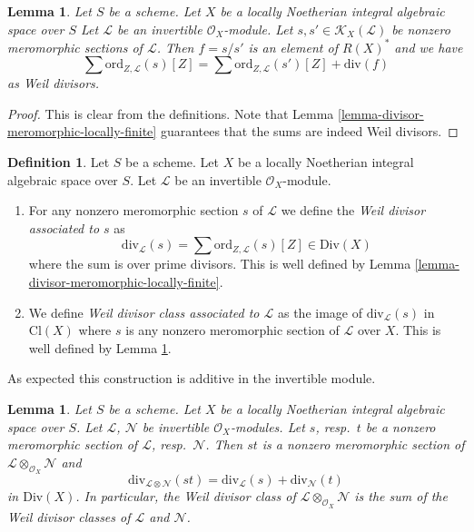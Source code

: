 \documentclass{stacks-project}
\theoremstyle{plain}
\newtheorem{lemma}[subsection]{Lemma}
\theoremstyle{definition}
\newtheorem{definition}[subsection]{Definition}
\theoremstyle{remark}
\numberwithin{equation}{subsection}
\begin{document}
\begin{lemma}
\label{lemma-divisor-meromorphic-well-defined}
Let $S$ be a scheme. Let $X$ be a locally Noetherian integral algebraic space
over $S$ Let $\mathcal{L}$ be an invertible $\mathcal{O}_X$-module.
Let $s, s' \in \mathcal{K}_X(\mathcal{L})$ be nonzero
meromorphic sections of $\mathcal{L}$. Then $f = s/s'$
is an element of $R(X)^*$ and we have
$$
\sum \text{ord}_{Z, \mathcal{L}}(s)[Z]
=
\sum \text{ord}_{Z, \mathcal{L}}(s')[Z]
+
\text{div}(f)
$$
as Weil divisors.
\end{lemma}

\begin{proof}
This is clear from the definitions.
Note that Lemma \ref{lemma-divisor-meromorphic-locally-finite}
guarantees that the sums are indeed Weil divisors.
\end{proof}

\begin{definition}
\label{definition-divisor-invertible-sheaf}
Let $S$ be a scheme. Let $X$ be a locally Noetherian integral algebraic space
over $S$. Let $\mathcal{L}$ be an invertible $\mathcal{O}_X$-module.
\begin{enumerate}
\item For any nonzero meromorphic section $s$ of $\mathcal{L}$
we define the {\it Weil divisor associated to $s$} as
$$
\text{div}_\mathcal{L}(s) =
\sum \text{ord}_{Z, \mathcal{L}}(s) [Z] \in \text{Div}(X)
$$
where the sum is over prime divisors. This is well defined by
Lemma \ref{lemma-divisor-meromorphic-locally-finite}.
\item We define {\it Weil divisor class associated to $\mathcal{L}$}
as the image of $\text{div}_\mathcal{L}(s)$ in $\text{Cl}(X)$
where $s$ is any nonzero meromorphic section of $\mathcal{L}$ over $X$.
This is well defined by
Lemma \ref{lemma-divisor-meromorphic-well-defined}.
\end{enumerate}
\end{definition}

\noindent
As expected this construction is additive in the invertible module.

\begin{lemma}
\label{lemma-c1-additive}
Let $S$ be a scheme. Let $X$ be a locally Noetherian integral algebraic space
over $S$. Let $\mathcal{L}$, $\mathcal{N}$ be invertible
$\mathcal{O}_X$-modules. Let $s$, resp.\ $t$ be a nonzero meromorphic section
of $\mathcal{L}$, resp.\ $\mathcal{N}$. Then $st$ is a nonzero
meromorphic section of $\mathcal{L} \otimes_{\mathcal{O}_X} \mathcal{N}$ and
$$
\text{div}_{\mathcal{L} \otimes \mathcal{N}}(st)
=
\text{div}_\mathcal{L}(s) + \text{div}_\mathcal{N}(t)
$$
in $\text{Div}(X)$. In particular, the Weil divisor class of
$\mathcal{L} \otimes_{\mathcal{O}_X} \mathcal{N}$ is the sum
of the Weil divisor classes of $\mathcal{L}$ and $\mathcal{N}$.
\end{lemma}
\end{document}
